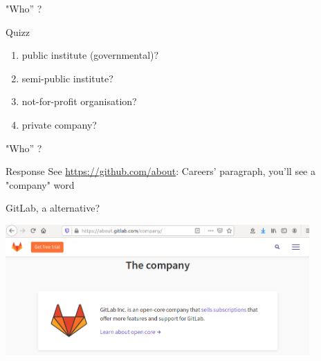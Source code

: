 \begin{frame}{ "Who” ?}
\begin{block}{Quizz}
\begin{enumerate}
    \item public institute (governmental)?
    \item semi-public institute?
    \item not-for-profit organisation?
    \item private company?
\end{enumerate}
\end{block}
\end{frame}
\begin{frame}{ "Who” ?}
\begin{block}{Response}
See \url{https://github.com/about}: Careers' paragraph, you'll see a "company" word
\end{block}
\end{frame}
\begin{frame}{GitLab, a  alternative?}
\begin{center}
\includegraphics[height=5cm]{05_history/Images/FAIR_gitlab_company.png}
\end{center}
\end{frame}

